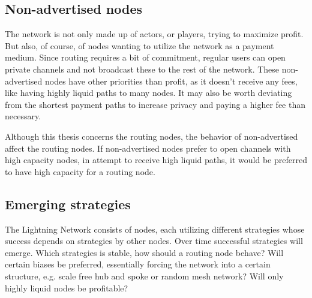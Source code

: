 \subsection{Non-advertised nodes}

The network is not only made up of actors, or players, trying to maximize profit. But also, of course, of nodes wanting to utilize the network as a payment medium. Since routing requires a bit of commitment, regular users can open private channels and not broadcast these to the rest of the network. These non-advertised nodes have other priorities than profit, as it doesn't receive any fees, like having highly liquid \gls{path}s to many nodes. It may also be worth deviating from the shortest payment paths to increase privacy and paying a higher fee than necessary.

Although this thesis concerns the routing \gls{node}s, the behavior of non-advertised affect the routing nodes. If non-advertised nodes prefer to open channels with high capacity nodes, in attempt to receive high liquid paths, it would be preferred to have high capacity for a routing node.  

\subsection{Emerging strategies}

The \gls{Lightning Network} consists of nodes, each utilizing different strategies whose success depends on strategies by other nodes. Over time successful strategies will emerge. Which strategies is stable, how should a routing node behave? Will certain biases be preferred, essentially forcing the network into a certain structure, e.g. scale free hub and spoke or random mesh network? Will only highly liquid \gls{node}s be profitable?

\newpage
\onecolumn

